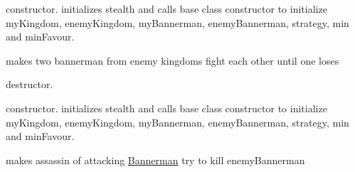 
\begin{DoxyRefList}
\item[Member \mbox{\hyperlink{class_ambush_aec9d5a1a757133058df754172f98a128}{Ambush\+::Ambush}} (int stealth, \mbox{\hyperlink{class_kingdom}{Kingdom}} $\ast$my\+Kingdom, \mbox{\hyperlink{class_kingdom}{Kingdom}} $\ast$enemy\+Kingdom, \mbox{\hyperlink{class_bannerman}{Bannerman}} $\ast$my\+Bannerman, \mbox{\hyperlink{class_bannerman}{Bannerman}} $\ast$enemy\+Bannerman, string name, int min, int min\+Favour)]\label{todo__todo000001}%
%
constructor. initializes stealth and calls base class constructor to initialize my\+Kingdom, enemy\+Kingdom, my\+Bannerman, enemy\+Bannerman, strategy, min and min\+Favour.  
\item[Member \mbox{\hyperlink{class_ambush_a51193e1b97edc379fb3c79918132ea15}{Ambush\+::attack}} (\mbox{\hyperlink{class_bannerman}{Bannerman}} $\ast$my\+Bannerman, \mbox{\hyperlink{class_bannerman}{Bannerman}} $\ast$enemy\+Bannerman)]\label{todo__todo000002}%
%
makes two bannerman from enemy kingdoms fight each other until one loses  
\item[Member \mbox{\hyperlink{class_ambush_a36a5798e6b3b4493e5e1c925d57d6a39}{Ambush\+::$\sim$\+Ambush}} ()]\label{todo__todo000003}%
%
destructor.  
\item[Member \mbox{\hyperlink{class_assassinate_aa27aab043fa4046d8468203b0e88fa13}{Assassinate\+::Assassinate}} (int stealth, bool alive, \mbox{\hyperlink{class_kingdom}{Kingdom}} $\ast$my\+Kingdom, \mbox{\hyperlink{class_kingdom}{Kingdom}} $\ast$enemy\+Kingdom, \mbox{\hyperlink{class_bannerman}{Bannerman}} $\ast$my\+Bannerman, \mbox{\hyperlink{class_bannerman}{Bannerman}} $\ast$enemy\+Bannerman, string name, int min, int min\+Favour)]\label{todo__todo000004}%
%
constructor. initializes stealth and calls base class constructor to initialize my\+Kingdom, enemy\+Kingdom, my\+Bannerman, enemy\+Bannerman, strategy, min and min\+Favour.  
\item[Member \mbox{\hyperlink{class_assassinate_aa650bb6fb68529914922728d6cc9cb07}{Assassinate\+::attack}} (\mbox{\hyperlink{class_bannerman}{Bannerman}} $\ast$my\+Bannerman, \mbox{\hyperlink{class_bannerman}{Bannerman}} $\ast$enemy\+Bannerman)]\label{todo__todo000005}%
%
makes assassin of attacking \mbox{\hyperlink{class_bannerman}{Bannerman}} try to kill enemy\+Bannerman  
\item[Member \mbox{\hyperlink{class_assassinate_a3f7d6fa4b38fb46cb63fbcc9509c0730}{Assassinate\+::$\sim$\+Assassinate}} ()]\label{todo__todo000006}%

\end{DoxyRefList}
